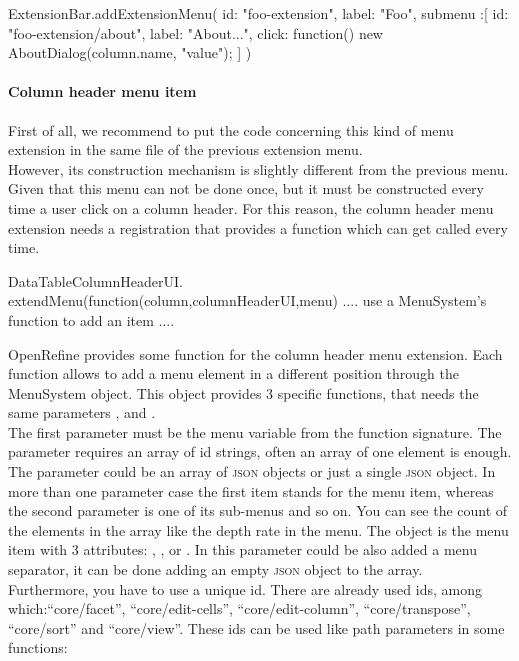 \begin{code}
ExtensionBar.addExtensionMenu({
   id: "foo-extension",
   label: "Foo",
   submenu :[
   {
      id: "foo-extension/about",
      label: "About...",
      click: function() { 
         new AboutDialog(column.name, "value");
      }
   }]
})
\end{code}

\paragraph{Column header menu item} First of all, we recommend to put the code concerning this kind of menu extension in the same file of the previous extension menu. \\
However, its construction mechanism is slightly different from the previous menu. Given that this menu can not be done once, but it must be constructed every time a user click on a column header. For this reason, the column header menu extension needs a registration that provides a function which can get called every time. \\
\begin{code}
DataTableColumnHeaderUI.
        extendMenu(function(column,columnHeaderUI,menu){
	.... use a MenuSystem's function to add an item ....
}
\end{code}
OpenRefine provides some function for the column header menu extension. Each function allows to add a menu element in a different position through the MenuSystem object. This object provides 3 specific functions, that needs the same parameters ,  and . \\
The first parameter must be the menu variable from the function signature. The  parameter requires an array of id strings, often an array of one element is enough. The  parameter could be an array of \textsc{json} objects or just a single \textsc{json} object. In more than one parameter case the first item stands for the menu item, whereas the second parameter is one of its sub-menus and so on. You can see the count of the elements in the array like the depth rate in the menu. The object is the menu item with 3 attributes: , ,  or . In this parameter could be also added a menu separator, it can be done adding an empty \textsc{json} object to the array. \\
Furthermore, you have to use a unique id. There are already used ids, among which:``core/facet'', ``core/edit-cells'', ``core/edit-column'', ``core/transpose'', ``core/sort'' and ``core/view''. These ids can be used like path parameters in some functions:
